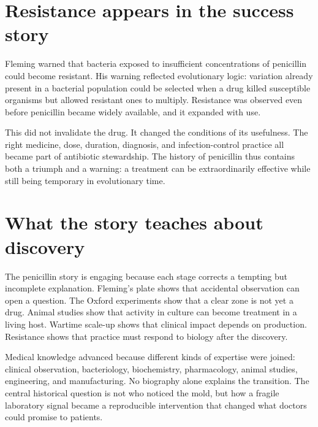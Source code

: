 \documentclass[12pt,oneside]{book}
\begin{document}
\section{Resistance appears in the success story}
Fleming warned that bacteria exposed to insufficient concentrations of
penicillin could become resistant. His warning reflected evolutionary logic:
variation already present in a bacterial population could be selected when a
drug killed susceptible organisms but allowed resistant ones to multiply.
Resistance was observed even before penicillin became widely available, and it
expanded with use.

This did not invalidate the drug. It changed the conditions of its usefulness.
The right medicine, dose, duration, diagnosis, and infection-control practice
all became part of antibiotic stewardship. The history of penicillin thus
contains both a triumph and a warning: a treatment can be extraordinarily
effective while still being temporary in evolutionary time.

\section{What the story teaches about discovery}
The penicillin story is engaging because each stage corrects a tempting but
incomplete explanation. Fleming's plate shows that accidental observation can
open a question. The Oxford experiments show that a clear zone is not yet a
drug. Animal studies show that activity in culture can become treatment in a
living host. Wartime scale-up shows that clinical impact depends on production.
Resistance shows that practice must respond to biology after the discovery.

Medical knowledge advanced because different kinds of expertise were joined:
clinical observation, bacteriology, biochemistry, pharmacology, animal studies,
engineering, and manufacturing. No biography alone explains the transition.
The central historical question is not who noticed the mold, but how a fragile
laboratory signal became a reproducible intervention that changed what doctors
could promise to patients.
\end{document}
